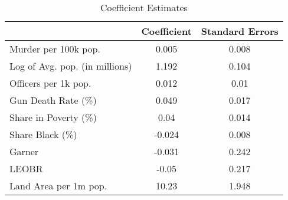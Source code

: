 \begin{table}[ht]
\centering
\caption{Coefficient Estimates} \label{table:coefficients}
\begin{tabular}{lcc}
\hline \hline
& Coefficient & Standard Errors \\ 
\hline
Murder per 100k pop. &0.005&0.008\\
Log of Avg. pop. (in millions) &1.192&0.104\\
Officers per 1k pop. &0.012&0.01\\
Gun Death Rate (\%) &0.049&0.017\\
Share in Poverty (\%) &0.04&0.014\\
Share Black (\%) &-0.024&0.008\\
Garner &-0.031&0.242\\
LEOBR &-0.05&0.217\\
Land Area per 1m pop. &10.23&1.948\\
\hline \end{tabular} \end{table}